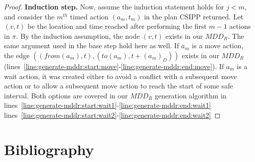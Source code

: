\documentclass[review]{elsarticle}
\newcommand{\mddr}{\ensuremath{MDD_R}\xspace}
\newcommand{\fromv}{\ensuremath{\mathit{from}}\xspace}
\newcommand{\tov}{\ensuremath{\mathit{to}}\xspace}
\newcommand{\csipp}{\ac{CSIPP}\xspace}
\newcommand{\mapf}{\ac{MAPF}\xspace}
\begin{document}
\begin{proof}
\textbf{Induction step.}
Now, assume the induction statement holds for $j<m$, and consider the $m^{th}$ timed action $(a_m, t_m)$ in the plan \csipp returned. 
Let $(v,t)$ be the location and time reached after performing the first $m-1$ actions in $\pi$. 
By the induction assumption, the node $(v,t)$ exists in our \mddr. 
The same argument used in the base step hold here as well. 
If $a_m$ is a move action, the edge $((\fromv(a_m), t),(\tov(a_m),t+(a_m)_D))$ exists in our \mddr (lines~\ref{line:generate-mddr:start:move}-\ref{line:generate-mddr:end:move}). 
If $a_m$ is a wait action, it was created either to avoid a conflict with a subsequent move action or to allow a subsequent move action to reach the start of some safe interval.  
Both options are covered in our \mddr generation algorithm in 
lines~\ref{line:generate-mddr:start:wait1}-\ref{line:generate-mddr:end:wait1}
lines~\ref{line:generate-mddr:start:wait2}-\ref{line:generate-mddr:end:wait2}
\end{proof}



%
\section*{Bibliography}




\end{document}
